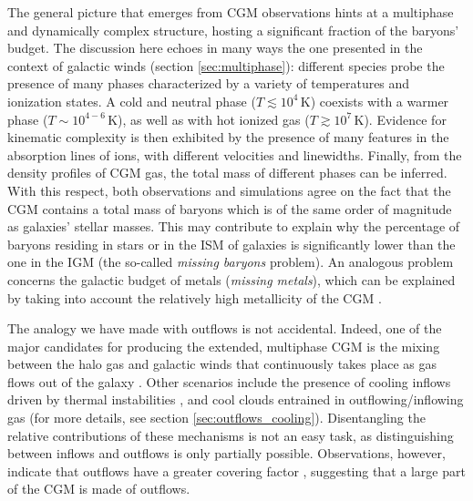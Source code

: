 The general picture that emerges from CGM observations hints at a multiphase and dynamically complex structure, hosting a significant fraction of the baryons' budget. The discussion here echoes in many ways the one presented in the context of galactic winds (section \ref{sec:multiphase}): different species probe the presence of many phases characterized by a variety of temperatures and ionization states. A cold and neutral phase ($T\lesssim 10^4\,\mathrm{K}$) coexists with a warmer phase ($T\sim10^{4-6}\,\mathrm{K}$), as well as with hot ionized gas ($T\gtrsim 10^7\,\mathrm{K}$). Evidence for kinematic complexity is then exhibited by the presence of many features in the absorption lines of ions, with different velocities and linewidths. Finally, from the density profiles of CGM gas, the total mass of different phases can be inferred. With this respect, both observations and simulations agree on the fact that the CGM contains a total mass of baryons which is of the same order of magnitude as galaxies' stellar masses. This may contribute to explain why the percentage of baryons residing in stars or in the ISM of galaxies is significantly lower than the one in the IGM (the so-called \textit{missing baryons} problem). An analogous problem concerns the galactic budget of metals (\textit{missing metals}), which can be explained by taking into account the relatively high metallicity of the CGM \citep[e.g.,][]{lehner2018}. 


The analogy we have made with outflows is not accidental. Indeed, one of the major candidates for producing the extended, multiphase CGM is the mixing between the halo gas and galactic winds that continuously takes place as gas flows out of the galaxy \citep{Thompson16,fielding2017impact}. Other scenarios include the presence of cooling inflows driven by thermal instabilities \citep{mccourt2012thermal}, and cool clouds entrained in outflowing/inflowing gas (for more details, see section \ref{sec:outflows_cooling}). Disentangling the relative contributions of these mechanisms is not an easy task, as distinguishing between inflows and outflows is only partially possible. Observations, however, indicate that outflows have a greater covering factor \citep{rubin2014evidence}, suggesting that a large part of the CGM is made of outflows.  


